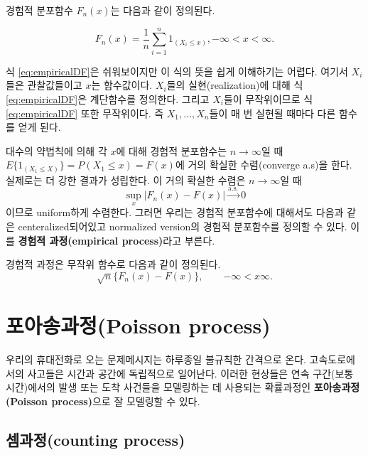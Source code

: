 \documentclass[b5paper,]{scrbook}
\theoremstyle{plain}
\theoremstyle{definition}
\numberwithin{equation}{section}
\let\BeginKnitrBlock\begin \let\EndKnitrBlock\end
\begin{document}
\BeginKnitrBlock{definition}[경험적 분포함수]
\protect\hypertarget{def:unnamed-chunk-149}{}{\label{def:unnamed-chunk-149} {} }경험적 분포함수 \(F_{n}(x)\)는 다음과 같이 정의된다.

\begin{equation}
F_{n}(x)=\frac{1}{n}\sum_{i=1}^{n}1_{(X_{i}\leq x)}, -\infty < x < \infty.
\label{eq:empiricalDF}
\end{equation}
\EndKnitrBlock{definition}

식 \eqref{eq:empiricalDF}은 쉬워보이지만 이 식의 뜻을 쉽게 이해하기는 어렵다. 여기서 \(X_{i}\)들은 관찰값들이고 \(x\)는 함수값이다. \(X_{i}\)들의 실현(realization)에 대해 식 \eqref{eq:empiricalDF}은 계단함수를 정의한다. 그리고 \(X_{i}\)들이 무작위이므로 식 \eqref{eq:empiricalDF} 또한 무작위이다. 즉 \(X_{1},\ldots ,X_{n}\)들이 매 번 실현될 때마다 다른 함수를 얻게 된다.

대수의 약법칙에 의해 각 \(x\)에 대해 경험적 분포함수는 \(n\rightarrow\infty\)일 때 \(E\{1_{(X_{1}\leq X)}\}=P(X_{1}\leq x)=F(x)\)에 거의 확실한 수렴(converge a.s)을 한다. 실제로는 더 강한 결과가 성립한다. 이 거의 확실한 수렴은 \(n\rightarrow\infty\)일 때
\[\sup_{x}|F_{n}(x)-F(x)|\stackrel{\text{a.s.}}{\rightarrow}0\]
이므로 uniform하게 수렴한다. 그러면 우리는 경험적 분포함수에 대해서도 다음과 같은 centeralized되어있고 normalized version의 경험적 분포함수를 정의할 수 있다. 이를 \textbf{경험적 과정(empirical process)}라고 부른다.

\BeginKnitrBlock{definition}[경험적 과정]
\protect\hypertarget{def:unnamed-chunk-150}{}{\label{def:unnamed-chunk-150} {} }경험적 과정은 무작위 함수로 다음과 같이 정의된다.
\[\sqrt{n}\{ F_{n}(x) - F(x) \},\qquad{-\infty < x \infty.}\]
\EndKnitrBlock{definition}

\hypertarget{poisson-process}{%
\section{포아송과정(Poisson process)}\label{poisson-process}}

우리의 휴대전화로 오는 문제메시지는 하루종일 불규칙한 간격으로 온다. 고속도로에서의 사고들은 시간과 공간에 독립적으로 일어난다. 이러한 현상들은 연속 구간(보통 시간)에서의 발생 또는 도착 사건들을 모델링하는 데 사용되는 확률과정인 \textbf{포아송과정(Poisson process)}으로 잘 모델링할 수 있다.

\hypertarget{counting-process}{%
\subsection{셈과정(counting process)}\label{counting-process}}
\end{document}
